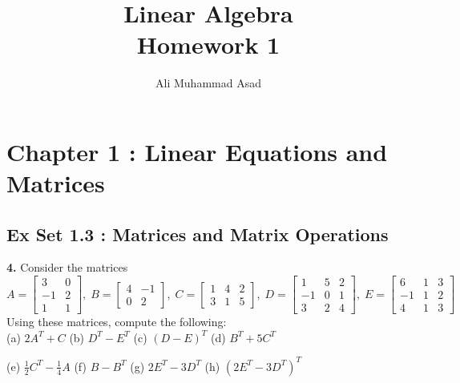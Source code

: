 \documentclass[addpoints]{exam}
\title{Linear Algebra\\ Homework 1}
\author{Ali Muhammad Asad}
\begin{document}
\maketitle
\begin{sloppypar}
\section*{\textbf{Chapter 1 : Linear Equations and Matrices}}

\subsection*{\textbf{Ex Set 1.3 : Matrices and Matrix Operations}}

\begin{questions}
    \question
    \textbf{4. } Consider the matrices
    $$ A = \begin{bmatrix}
        3 & 0 \\ -1 & 2 \\ 1 & 1
    \end{bmatrix},\; B = \begin{bmatrix}
        4 & -1 \\ 0 & 2
    \end{bmatrix},\; C = \begin{bmatrix}
        1 & 4 & 2 \\ 3 & 1 & 5
    \end{bmatrix},\; D = \begin{bmatrix}
        1 & 5 & 2 \\ -1 &  0 & 1 \\ 3 & 2 & 4
    \end{bmatrix},\; E = \begin{bmatrix}
        6 & 1 & 3 \\ -1 & 1 & 2 \\ 4 & 1 & 3
    \end{bmatrix} $$
    Using these matrices, compute the following: \\ 
    (a) $ 2A^T + C $ \hspace{10mm} (b) $ D^T - E^T $ \hspace{10mm} (c) $ (D - E)^T $ \hspace{10mm} (d) $ B^T + 5C^T $
    
    \vspace{2mm} (e) $ \frac{1}{2}C^T - \frac{1}{4}A $ \hspace{7.5mm} (f) $ B - B^T $ \hspace{13mm} (g) $ 2E^T - 3D^T $  \hspace{7mm} (h) $ (2E^T - 3D^T)^T $
    \begin{solution}


\end{solution}
\end{questions}
\end{sloppypar}
\end{document}
